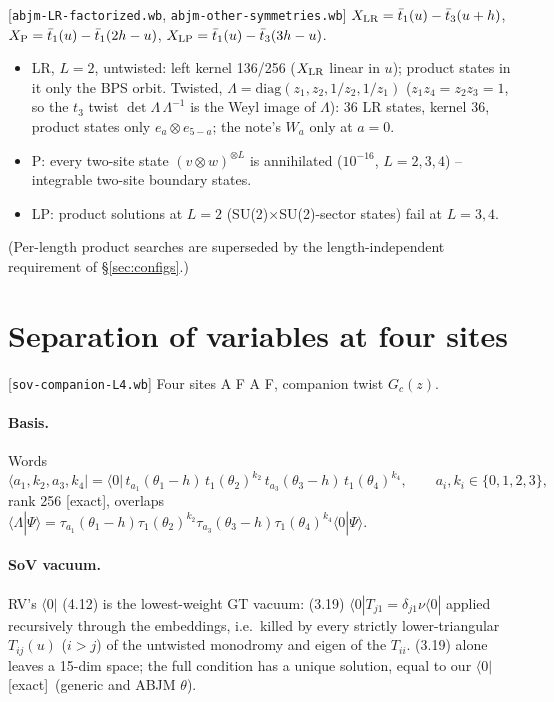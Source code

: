 \documentclass[11pt]{article}
\newcommand{\tb}{\bar t}
\newcommand{\nb}[1]{\texttt{#1}}
\newcommand{\ex}{\textsf{[exact]}}
\newcommand{\bra}[1]{\langle#1|}
\begin{document}
[\nb{abjm-LR-factorized.wb}, \nb{abjm-other-symmetries.wb}] $X_{\rm LR}=\tb_1(u)-\tb_3(u+h)$,
$X_{\rm P}=\tb_1(u)-\tb_1(2h-u)$, $X_{\rm LP}=\tb_1(u)-\tb_3(3h-u)$.
\begin{itemize}
\item LR, $L=2$, untwisted: left kernel 136/256 ($X_{\rm LR}$ linear in $u$); product states in it only the BPS orbit.
Twisted, $\Lambda=\mathrm{diag}(z_1,z_2,1/z_2,1/z_1)$ ($z_1z_4=z_2z_3=1$, so the $t_3$ twist $\det\Lambda\,\Lambda^{-1}$ is the Weyl
image of $\Lambda$): 36 LR states, kernel 36, product states only $e_a\otimes e_{5-a}$; the note's $W_a$ only at $a=0$.
\item P: every two-site state $(v\otimes w)^{\otimes L}$ is annihilated ($10^{-16}$, $L=2,3,4$) -- integrable two-site
boundary states.
\item LP: product solutions at $L=2$ (SU(2)$\times$SU(2)-sector states) fail at $L=3,4$.
\end{itemize}
(Per-length product searches are superseded by the length-independent requirement of \S\ref{sec:configs}.)

\section{Separation of variables at four sites}\label{sec:sov}

[\nb{sov-companion-L4.wb}] Four sites A F A F, companion twist $G_c(z)$.

\paragraph{Basis.} Words
\begin{equation}
 \langle a_1,k_2,a_3,k_4|=\bra0\,t_{a_1}(\theta_1-h)\,t_1(\theta_2)^{k_2}\,t_{a_3}(\theta_3-h)\,t_1(\theta_4)^{k_4},\qquad
 a_i,k_i\in\{0,1,2,3\},
\end{equation}
rank 256 \ex, overlaps $\langle\Lambda|\Psi\rangle=\tau_{a_1}(\theta_1-h)\tau_1(\theta_2)^{k_2}\tau_{a_3}(\theta_3-h)\tau_1(\theta_4)^{k_4}\bra0\Psi\rangle$.

\paragraph{SoV vacuum.} RV's $\bra0$ (4.12) is the lowest-weight GT vacuum: (3.19) $\bra0T_{j1}=\delta_{j1}\nu\bra0$ applied
recursively through the embeddings, i.e.\ killed by every strictly lower-triangular $T_{ij}(u)$ ($i>j$) of the
untwisted monodromy and eigen of the $T_{ii}$. (3.19) alone leaves a 15-dim space; the full condition has a unique
solution, equal to our $\bra0$ \ex\ (generic and ABJM $\theta$).
\end{document}
